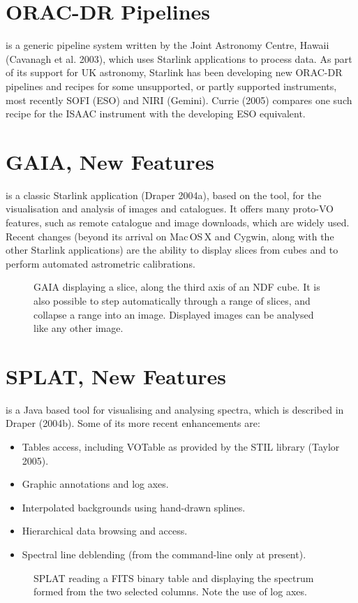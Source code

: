 \documentclass[11pt,twoside]{article}  %
\begin{document}
\section{ORAC-DR Pipelines}

is a generic pipeline system written by the Joint Astronomy Centre,
Hawaii (Cavanagh et al. 2003), which uses Starlink applications to
process data.  As part of its support for UK astronomy, Starlink has
been developing new ORAC-DR pipelines and recipes for some
unsupported, or partly supported instruments, most recently SOFI (ESO)
and NIRI (Gemini).  Currie (2005) compares one such recipe for the ISAAC
instrument with the developing ESO equivalent.

\section{GAIA, New Features}

 is a classic
Starlink application (Draper 2004a), based on the
 tool, for the
visualisation and analysis of images and catalogues. 
It offers many proto-VO features, such as remote catalogue and image
downloads, which are widely used. 
Recent changes (beyond its arrival on Mac\,OS\,X and Cygwin, along with the
other Starlink applications) are the ability to display slices from cubes and
to perform automated astrometric calibrations.

\begin{figure}
\caption{GAIA displaying a slice, along the third axis of an NDF cube. It is
also possible to step automatically through a range of slices, and collapse
a range into an image. Displayed images can be analysed like any other image.}
\end{figure}

\section{SPLAT, New Features}
is a Java based tool for visualising and analysing spectra, which is
described in Draper (2004b). Some of its more recent enhancements are:
\begin{itemize}
\item Tables access, including VOTable as provided by the STIL library
(Taylor 2005).
\item Graphic annotations and log axes.
\item Interpolated backgrounds using hand-drawn splines.
\item Hierarchical data browsing and access.
\item Spectral line deblending (from the command-line only at present).
\end{itemize}
\begin{figure}
\caption{SPLAT reading a FITS binary table and displaying the spectrum formed
from the two selected columns. Note the use of log axes.}
\end{figure}
\end{document}
